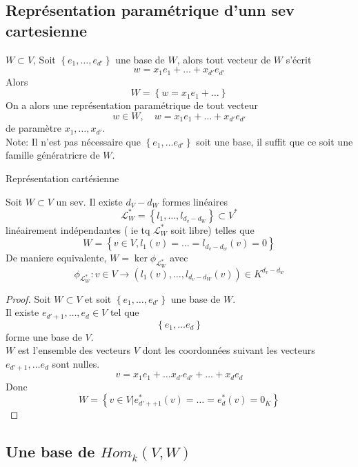 \documentclass[../main.tex]{subfiles}
\begin{document}
\subsection{Représentation paramétrique d'unn sev cartesienne}
$W \subset V$, Soit $ \left\{ e_1, \ldots, e_{d'}  \right\} $ une base de $W$, alors tout vecteur de $W$ s'écrit
\[ 
w= x_1e_1+ \ldots + x_{d'} e_{d'} 
\]
Alors
\[ 
W= \left\{ w= x_1e_1 + \ldots \right\} 
\]
On a alors une représentation paramétrique de tout vecteur
\[ 
w \in W, \quad w= x_1e_1 + \ldots + x_{d'} e_{d'} 
\]
de paramètre $x_1, \ldots, x_{ d' }$.\\
Note: Il n'est pas nécessaire que
 $ \left\{ e_1, \ldots e_{d'}  \right\} $ soit une base, il suffit que ce soit une famille génératricre de $W$.

 \begin{center}
 Représentation cartésienne
 \end{center}
 \begin{propo}
 Soit $W \subset V$ un sev. Il existe $d_V - d_W$ formes linéaires
 \[ 
 \mathcal{L}_W^{*}= \left\{ l_1, \ldots, l_{d_v-d_W}  \right\}  \subset V^{*}
 \]
 linéairement indépendantes ( ie tq $\mathcal{L}_W^{*}$ soit libre) telles que
 \[ 
	 W = \left\{ v \in V, l_1( v) = \ldots = l_{d_v-d_w} ( v) = 0 \right\} 
 \]
 De maniere equivalente, $W = \ker \phi_{\mathcal{L}_W^{*}} $ avec
 \[ 
	 \phi_{\mathcal{L}_W^{*}}: v \in V \to ( l_1( v) , \ldots, l_{d_v - d_W} ( v) ) \in K^{d_v -d_w}
 \]
 
 \end{propo}
 \begin{proof}
 Soit $W \subset V$ et soit $ \left\{ e_1, \ldots, e_{d'}  \right\} $ une base de $W$.\\
 Il existe $e_{d'+1} , \ldots , e_{d} \in V $ tel que
 \[ 
 \left\{ e_1, \ldots e_d \right\} 
 \]
 forme une base de $V$.\\
 $W$ est l'ensemble des vecteurs $V$ dont les coordonnées suivant les vecteurs $e_{d'+1} , \ldots e_d$ sont nulles.
\[ 
v = x_1e_1 + \ldots x_{d'} e_{d'} + \ldots + x_d e_d
\]
Donc
\[ 
	W = \left\{ v \in V | e_{d'++1} ^{*}( v) = \ldots = e_{d} ^{*}( v) =0_K \right\} 
\]

 \end{proof}
 
 \subsection{Une base de $Hom_k( V,W) $}
 
\end{document}
